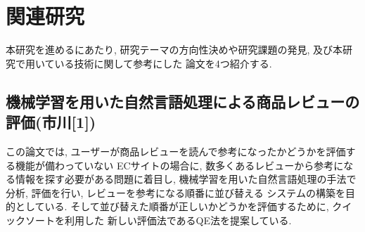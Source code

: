 \documentclass{ltjarticle}
\begin{document}
\newpage
\section{関連研究}
本研究を進めるにあたり, 研究テーマの方向性決めや研究課題の発見, 及び本研究で用いている技術に関して参考にした
論文を4つ紹介する. 
\subsection{機械学習を用いた自然言語処理による商品レビューの評価(市川[1])}
この論文では, ユーザーが商品レビューを読んで参考になったかどうかを評価する機能が備わっていない
ECサイトの場合に, 数多くあるレビューから参考になる情報を探す必要がある問題に着目し, 
機械学習を用いた自然言語処理の手法で分析, 評価を行い, レビューを参考になる順番に並び替える
システムの構築を目的としている. そして並び替えた順番が正しいかどうかを評価するために, クイックソートを利用した
新しい評価法であるQE法を提案している. 
\end{document}
